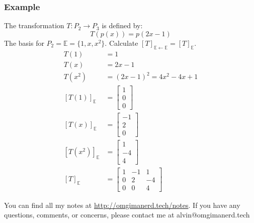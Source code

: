 \documentclass{math}
\begin{document}
\subsubsection*{Example}
The transformation \( T:P_2\to P_3 \) is defined by:
\[ T(p(x)) = p(2x-1) \]
The basis for \( P_2 = \mathbb{E} = \{1,x,x^2\} \). Calculate
\( [T]_{\mathbb{E}\leftarrow\mathbb{E}} = [T]_{\mathbb{E}} \).
\begin{align*}
  T(1) &= 1 \\
  T(x) &= 2x-1 \\
  T(x^2) &= (2x-1)^2 = 4x^2-4x+1 \\
  [T(1)]_{\mathbb{E}} &= \begin{bmatrix}1 \\ 0 \\ 0\end{bmatrix} \\
  [T(x)]_{\mathbb{E}} &= \begin{bmatrix}-1 \\ 2 \\ 0\end{bmatrix} \\
  [T(x^2)]_{\mathbb{E}} &= \begin{bmatrix}1 \\ -4 \\ 4\end{bmatrix} \\
  [T]_{\mathbb{E}} &= \begin{bmatrix}
    1 & -1 & 1 \\
    0 & 2 & -4 \\
    0 & 0 & 4
  \end{bmatrix}
\end{align*}

\begin{center}
  You can find all my notes at \url{http://omgimanerd.tech/notes}. If you have
  any questions, comments, or concerns, please contact me at
  alvin@omgimanerd.tech
\end{center}
\end{document}
